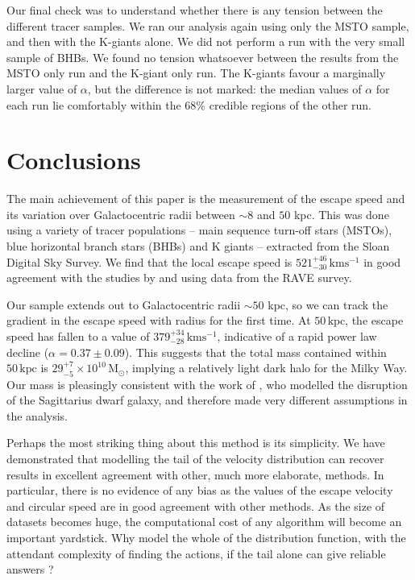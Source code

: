 \documentclass[useAMS,twocolumn,usenatbib]{mn2e}
\def\kpc{{\,\mathrm{kpc}}}
\def\kms{{\,\mathrm{kms^{-1}}}}
\def\Msun{{\,\mathrm{M}_\odot}}
\begin{document}
Our final check was to understand whether there is any tension between the different tracer samples. 
We ran our analysis again using only the MSTO sample, and then with the K-giants alone. 
We did not perform a run with the very small sample of BHBs. 
We found no tension whatsoever between the results from the MSTO only run and the K-giant only run. 
The K-giants favour a marginally larger value of $\alpha$, but the difference is not marked: the median values of $\alpha$ for each run lie comfortably within the 68\% credible regions of the other run.

\section{Conclusions}

The main achievement of this paper is the measurement of the escape speed and its variation over Galactocentric radii between $\sim 8$ and $50$ kpc.  
This was done using a variety of tracer populations -- main sequence turn-off stars (MSTOs), blue horizontal branch stars (BHBs) and K giants -- extracted from the Sloan Digital Sky Survey. 
We find that the local escape speed is $521^{+46}_{-30}\kms$ in good agreement with the studies by \cite{Sm07} and \cite{Pi14} using data from the RAVE survey.

Our sample extends out to Galactocentric radii $\sim 50$ kpc, so we can track the gradient in the escape speed with radius for the first time. 
At $50\kpc$, the escape speed has fallen to a value of $379^{+34}_{-28}\kms$, indicative of a rapid power law decline ($\alpha = 0.37\pm0.09$).
This suggests that the total mass contained within $50\kpc$ is $29^{+7}_{-5}\times10^{10}\Msun$, implying a relatively light dark halo for the Milky Way. 
Our mass is pleasingly consistent with the work of \citet{Gi14}, who modelled the disruption of the Sagittarius dwarf galaxy, and therefore made very different assumptions in the analysis.

Perhaps the most striking thing about this method is its simplicity. 
We have demonstrated that modelling the tail of the velocity distribution can recover results in excellent agreement with other, much more elaborate, methods. 
In particular, there is no evidence of any bias as the values of the escape velocity and circular speed are in good agreement with other methods.  
As the size of datasets becomes huge, the computational cost of any algorithm will become an important yardstick. 
Why model the whole of the distribution function, with the attendant complexity of finding the actions, if the tail alone can give reliable answers ? 
\end{document}
